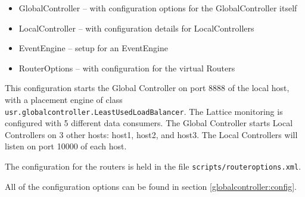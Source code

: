 \begin{itemize}
\item GlobalController -- with configuration options for the GlobalController itself
\item LocalController -- with configuration details for LocalControllers
\item EventEngine -- setup for an EventEngine
\item RouterOptions -- with configuration for the virtual Routers
\end{itemize}

\noindent This configuration starts the Global
Controller on port 8888 of the local host,
with a placement engine of class \texttt{usr.globalcontroller.LeastUsedLoadBalancer}.
The Lattice monitoring is configured with 5 different data consumers.
The Global Controller starts
 Local Controllers on 3 other hosts: host1, host2, and host3.
The Local Controllers will listen on
port 10000 of each host.

The configuration for the routers is held in the file
\texttt{scripts/routeroptions.xml}.




\noindent All of the configuration options can be found in section
\ref{globalcontroller:config}.



